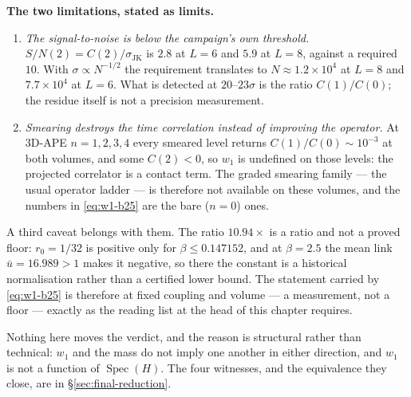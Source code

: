 \begin{v2box}
\textbf{The two limitations, stated as limits.}
\begin{enumerate}
\item \emph{The signal-to-noise is below the campaign's own threshold.}
  $S/N(2)=C(2)/\sigma_{\mathrm{JK}}$ is $2.8$ at $L=6$ and $5.9$ at $L=8$, against a required
  $10$. With $\sigma\propto N^{-1/2}$ the requirement translates to $N\approx1.2\times10^{4}$ at
  $L=8$ and $7.7\times10^{4}$ at $L=6$. What is detected at $20$--$23\sigma$ is the ratio
  $C(1)/C(0)$; the residue itself is not a precision measurement.
\item \emph{Smearing destroys the time correlation instead of improving the operator.} At 3D-APE
  $n=1,2,3,4$ every smeared level returns $C(1)/C(0)\sim10^{-3}$ at both volumes, and some
  $C(2)<0$, so $w_1$ is undefined on those levels: the projected correlator is a contact term.
  The graded smearing family --- the usual operator ladder --- is therefore not available on
  these volumes, and the numbers in \eqref{eq:w1-b25} are the bare ($n=0$) ones.
\end{enumerate}
A third caveat belongs with them. The ratio $10.94\times$ is a ratio and not a proved floor:
$r_0=1/32$ is positive only for $\beta\le0.147152$, and at $\beta=2.5$ the mean link
$\bar u=16.989>1$ makes it negative, so there the constant is a historical normalisation rather
than a certified lower bound. The statement carried by \eqref{eq:w1-b25} is therefore \LE{} at
fixed coupling and volume --- a measurement, not a floor --- exactly as the reading list at the
head of this chapter requires.
\end{v2box}

Nothing here moves the verdict, and the reason is structural rather than technical: $w_1$ and the
mass do not imply one another in either direction, and $w_1$ is not a function of
$\operatorname{Spec}(H)$. The four witnesses, and the equivalence they close, are in
\S\ref{sec:final-reduction}.
